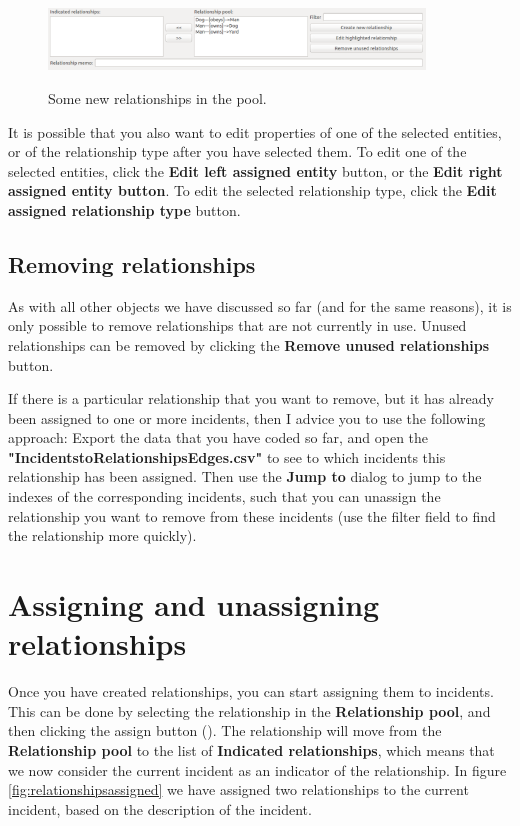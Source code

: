 \documentclass{memoir}
\begin{document}
\begin{figure}[h!]
  \centering
  \caption{Some new relationships in the pool.}
  \includegraphics[width=100mm]{Screenshot_21.pdf}
  \label{fig:relationshippool}
\end{figure}

It is possible that you also want to edit properties of one of the selected entities, or of the relationship type after you have selected them. To edit one of the selected entities, click the \textbf{Edit left assigned entity} button, or the \textbf{Edit right assigned entity button}. To edit the selected relationship type, click the \textbf{Edit assigned relationship type} button.

\subsection{Removing relationships}
\label{sec:removingrelationships}

As with all other objects we have discussed so far (and for the same reasons), it is only possible to remove relationships that are not currently in use. Unused relationships can be removed by clicking the \textbf{Remove unused relationships} button.

If there is a particular relationship that you want to remove, but it has already been assigned to one or more incidents, then I advice you to use the following approach: Export the data that you have coded so far, and open the \textbf{"Incidents\textunderscore to\textunderscore Relationships\textunderscore Edges.csv"} to see to which incidents this relationship has been assigned. Then use the \textbf{Jump to} dialog to jump to the indexes of the corresponding incidents, such that you can unassign the relationship you want to remove from these incidents (use the filter field to find the relationship more quickly).

\section{Assigning and unassigning relationships}
\label{sec:assigningunassigningrelationships}

Once you have created relationships, you can start assigning them to incidents. This can be done by selecting the relationship in the \textbf{Relationship pool}, and then clicking the assign button (\textbf{\guillemotleft}). The relationship will move from the \textbf{Relationship pool} to the list of \textbf{Indicated relationships}, which means that we now consider the current incident as an indicator of the relationship. In figure \ref{fig:relationshipsassigned} we have assigned two relationships to the current incident, based on the description of the incident.
\end{document}
